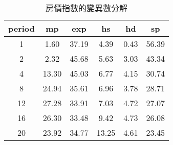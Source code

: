 \begin{table}[h]
\centering
\begin{tabular}{cccccc}
  \hline
period & mp & exp & hs & hd & sp \\ 
  \hline
1 & 1.60 & 37.19 & 4.39 & 0.43 & 56.39 \\ 
   \hline
2 & 2.32 & 45.68 & 5.63 & 3.03 & 43.34 \\ 
   \hline
4 & 13.30 & 45.03 & 6.77 & 4.15 & 30.74 \\ 
   \hline
8 & 24.94 & 35.61 & 6.96 & 3.78 & 28.71 \\ 
   \hline
12 & 27.28 & 33.91 & 7.03 & 4.72 & 27.07 \\ 
   \hline
16 & 26.30 & 33.48 & 9.42 & 4.73 & 26.08 \\ 
   \hline
20 & 23.92 & 34.77 & 13.25 & 4.61 & 23.45 \\ 
   \hline
\end{tabular}
\caption{房價指數的變異數分解} 
\end{table}
